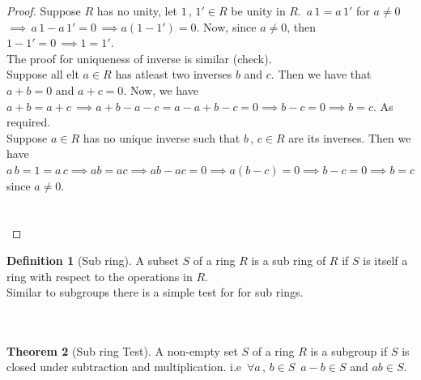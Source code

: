 \documentclass[11pt,a4paper]{article}
\theoremstyle{definition}
\newtheorem{thm}{Theorem}[subsection]
\newtheorem{defn}[thm]{Definition}
\begin{document}
\begin{proof}
Suppose $R$ has no unity, let $1\, , \, 1'\in R$ be unity in $R$. $\, a\, 1 = a\, 1'$ for $a\neq 0\,$\\ 
$\implies\, a\, 1 - a\, 1'  = 0\, \implies a (1 - 1') = 0$.
Now, since $a\neq 0$, then $1 - 1' = 0\, \implies 1 = 1'$.\\
The proof for uniqueness of inverse is similar (check).\\

Suppose all elt $a\in R$ has atleast two inverses $b$ and $c$. Then we have that $a + b = 0$ and $a + c = 0$. Now, we have $a + b = a + c\, \implies a + b - a - c = a- a + b - c = 0 \implies b - c = 0\implies b = c$. As required.\\
Suppose $a\in R$ has no unique inverse such that $b\, , \, c\in R$ are its inverses. Then we  have $a\, b = 1 = a\, c\implies ab = ac\implies ab - ac = 0\implies a(b-c) = 0\implies b - c = 0\implies b=c $ since $a\neq 0$.\\\\\\
\end{proof}







\begin{defn}[Sub ring]
A subset $S$ of a ring $R$ is a sub ring of $R$ if $S$ is itself a ring with respect to the operations in $R$.\\
Similar to subgroups there is a simple test for for sub rings.\\\\\\
\end{defn}






\begin{thm}[Sub ring Test]
A non-empty set $S$ of a ring $R$ is a subgroup if $S$ is closed under subtraction and multiplication. i.e $\, \forall a\, , \, b\in S\, \, \, a- b \in S$ and $ab\in S$.\\
\end{thm}
\end{document}
